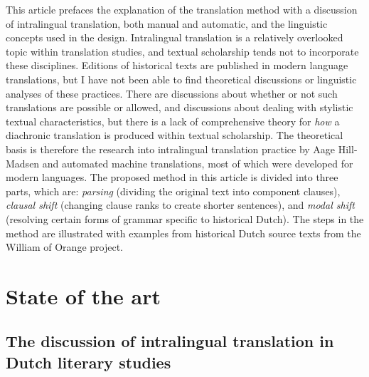\begin{paper}
This article prefaces the explanation of the translation method with a
discussion of intralingual translation, both manual and automatic, and
the linguistic concepts used in the design. Intralingual translation is
a relatively overlooked topic within translation studies, and textual
scholarship tends not to incorporate these disciplines. Editions of
historical texts are published in modern language translations, but I
have not been able to find theoretical discussions or linguistic
analyses of these practices. There are discussions about whether or not
such translations are possible or allowed, and discussions about dealing
with stylistic textual characteristics, but there is a lack of
comprehensive theory for \emph{how} a diachronic translation is produced
within textual scholarship. The theoretical basis is therefore the
research into intralingual translation practice by Aage Hill-Madsen and
automated machine translations, most of which were developed for modern
languages. The proposed method in this article is divided into three
parts, which are: \emph{parsing} (dividing the original text into
component clauses), \emph{clausal shift} (changing clause ranks to
create shorter sentences), and \emph{modal shift} (resolving certain
forms of grammar specific to historical Dutch). The steps in the method
are illustrated with examples from historical Dutch source texts from
the William of Orange project.

\section{State of the art}
\subsection{The discussion of intralingual translation in Dutch
literary studies}


\end{paper}
